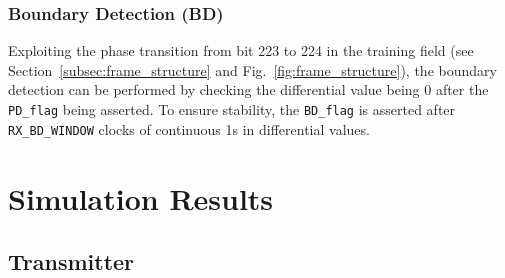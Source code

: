 \documentclass[journal,twoside]{IEEEtran}
\begin{document}
      \subsubsection{Boundary Detection (BD)}
      Exploiting the phase transition from bit 223 to 224 in the training field
      (see Section~\ref{subsec:frame_structure} and Fig.~\ref{fig:frame_structure}),
      the boundary detection can be performed by checking the differential value being 0
      after the \texttt{PD\_flag} being asserted.
      To ensure stability,
      the \texttt{BD\_flag} is asserted after \texttt{RX\_BD\_WINDOW} clocks of continuous 1s in differential values.

  \section{Simulation Results}

    \subsection{Transmitter}
\end{document}
